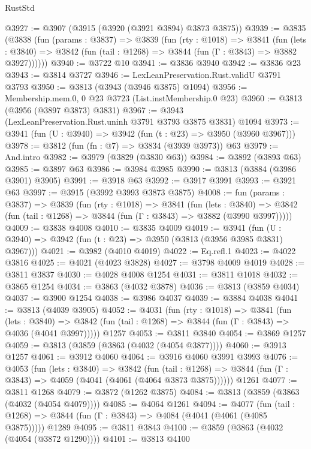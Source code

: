 \begin{lexlean}{RustStd}
\begin{coremodule}
{\begin{coremodule}
{{{{{{{{{{{{{{{{{{{{{{{{{{{{{{{{{{{@3927 := @3907 (@3915 (@3920 (@3921 @3894) @3873 @3875))
@3939 := @3835
    (@3838
      (fun (params : @3837) =>
      @3839
        (fun (rty : @1018) =>
        @3841
          (fun (lets : @3840) =>
          @3842 (fun (tail : @1268) => @3844 (fun (Γ : @3843) => @3882 @3927))))))
@3940 := @3722 @10
@3941 := @3836 @3940
@3942 := @3836 @23
@3943 := @3814 @3727
@3946 := LexLeanPreservation.Rust.validU @3791 @3793
@3950 := @3813 (@3943 (@3946 @3875) @1094)
@3956 := Membership.mem.{0, 0} @23 @3723 (List.instMembership.{0} @23)
@3960 := @3813 (@3956 (@3897 @3873) @3831)
@3967 := @3943 (LexLeanPreservation.Rust.uninh @3791 @3793 @3875 @3831) @1094
@3973 := @3941 (fun (U : @3940) => @3942 (fun (t : @23) => @3950 (@3960 @3967)))
@3978 := @3812 (fun (fn : @7) => @3834 (@3939 @3973)) @63
@3979 := And.intro
@3982 := @3979 (@3829 (@3830 @63))
@3984 := @3892 (@3893 @63)
@3985 := @3897 @63
@3986 := @3984 @3985
@3990 := @3813 (@3884 (@3986 @3901) @3905)
@3991 := @3918 @63
@3992 := @3917 @3991
@3993 := @3921 @63
@3997 := @3915 (@3992 @3993 @3873 @3875)
@4008 := fun (params : @3837) =>
  @3839
    (fun (rty : @1018) =>
    @3841
      (fun (lets : @3840) =>
      @3842 (fun (tail : @1268) => @3844 (fun (Γ : @3843) => @3882 (@3990 @3997)))))
@4009 := @3838 @4008
@4010 := @3835 @4009
@4019 := @3941 (fun (U : @3940) => @3942 (fun (t : @23) => @3950 (@3813 (@3956 @3985 @3831) @3967)))
@4021 := @3982 (@4010 @4019)
@4022 := Eq.refl.{1}
@4023 := @4022 @3816
@4025 := @4021 (@4023 @3828)
@4027 := @3798 @4009 @4019
@4028 := @3811 @3837
@4030 := @4028 @4008 @1254
@4031 := @3811 @1018
@4032 := @3865 @1254
@4034 := @3863 (@4032 @3878)
@4036 := @3813 (@3859 @4034)
@4037 := @3900 @1254
@4038 := @3986 @4037
@4039 := @3884 @4038
@4041 := @3813 (@4039 @3905)
@4052 := @4031
    (fun (rty : @1018) =>
    @3841
      (fun (lets : @3840) =>
      @3842 (fun (tail : @1268) => @3844 (fun (Γ : @3843) => @4036 (@4041 @3997)))))
    @1257
@4053 := @3811 @3840
@4054 := @3869 @1257
@4059 := @3813 (@3859 (@3863 (@4032 (@4054 @3877))))
@4060 := @3913 @1257
@4061 := @3912 @4060
@4064 := @3916 @4060 @3991 @3993
@4076 := @4053
    (fun (lets : @3840) =>
    @3842
      (fun (tail : @1268) => @3844 (fun (Γ : @3843) => @4059 (@4041 (@4061 (@4064 @3873 @3875))))))
    @1261
@4077 := @3811 @1268
@4079 := @3872 (@1262 @3875)
@4084 := @3813 (@3859 (@3863 (@4032 (@4054 @4079))))
@4085 := @4064 @1261
@4094 := @4077
    (fun (tail : @1268) => @3844 (fun (Γ : @3843) => @4084 (@4041 (@4061 (@4085 @3875)))))
    @1289
@4095 := @3811 @3843
@4100 := @3859 (@3863 (@4032 (@4054 (@3872 @1290))))
@4101 := @3813 @4100
}}}}}}}}}}}}}}}}}}}}}}}}}}}}}}}}}}}
\end{coremodule}}
\end{coremodule}
\end{lexlean}
